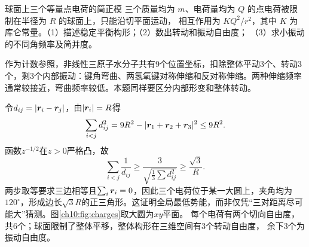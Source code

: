 \begin{origexamplebox}{球面上三个等量点电荷的简正模}\label{ch10:ex:charges}
三个质量均为 $m$、电荷量均为 $Q$ 的点电荷被限制在半径为 $R$ 的球面上，只能沿切平面运动，
相互作用为 $KQ^2/r^2$，其中 $K$ 为库仑常量。（1）描述稳定平衡构形；（2）数出转动和振动自由度；
（3）求小振动的不同角频率及简并度。

作为计数参照，非线性三原子水分子共有9个位置坐标，扣除整体平动3个、转动3个，剩3个内部振动：键角弯曲、两氢氧键对称伸缩和反对称伸缩。两种伸缩频率通常较接近，弯曲频率较低。本题同样要区分内部形变和整体转动。

\ThQSphereCharges
\end{origexamplebox}
\begin{xesolution}
令$d_{ij}=|\bm{r}_i-\bm{r}_j|$，由$|\bm{r}_i|=R$得
\[
 \sum_{i<j}d_{ij}^2=9R^2-|\bm{r}_1+\bm{r}_2+\bm{r}_3|^2\leq9R^2.
\]
函数$z^{-1/2}$在$z>0$严格凸，故
\[
 \sum_{i<j}\frac1{d_{ij}}\geq
 \frac3{\sqrt{\tfrac13\sum d_{ij}^2}}\geq\frac{\sqrt3}{R}.
\]
两步取等要求三边相等且$\sum_i\bm{r}_i=0$，因此三个电荷位于某一大圆上，夹角均为$120^\circ$，形成边长$\sqrt3R$的正三角形。这证明全局最低势能，而非仅凭“三对距离尽可能大”猜测。图\ref{ch10:fig:charges}取大圆为$xy$平面。
\chTenChargesFigure
每个电荷有两个切向自由度，共6个；球面限制了整体平移，整体构形在三维空间有3个转动自由度，
余下3个为振动自由度。


\end{xesolution}
